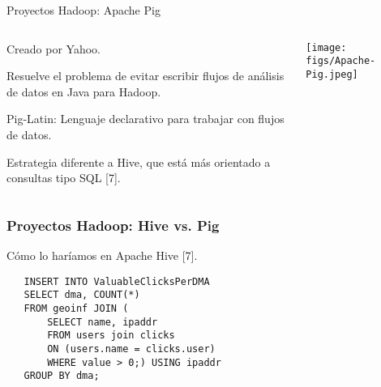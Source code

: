 
\begin{frame}{Proyectos Hadoop: Apache Pig}
 \begin{columns}[T]
    \begin{column}{.75\textwidth}
     \begin{wideitemize}
      \item Creado por Yahoo.
      \item Resuelve el problema de evitar escribir flujos de análisis de datos
      en Java para Hadoop.
      \item Pig-Latin: Lenguaje declarativo para trabajar con flujos de datos.
      \item Estrategia diferente a Hive, que está más orientado a consultas tipo SQL [7].

    \end{wideitemize}
    \end{column}
    \begin{column}{.25\textwidth}
    \vspace*{.7cm}
    \texttt{[image: figs/Apache-Pig.jpeg]}
    \end{column}
  \end{columns}

\end{frame}


\begin{frame}[fragile]
  \frametitle{Proyectos Hadoop: Hive vs. Pig}
  \begin{wideitemize}
      \item Cómo lo haríamos en Apache Hive [7].
  \end{wideitemize}
  \begin{verbatim}
   INSERT INTO ValuableClicksPerDMA
   SELECT dma, COUNT(*)
   FROM geoinf JOIN (
       SELECT name, ipaddr
       FROM users join clicks 
       ON (users.name = clicks.user)
       WHERE value > 0;) USING ipaddr
   GROUP BY dma;
  \end{verbatim}

\end{frame}


